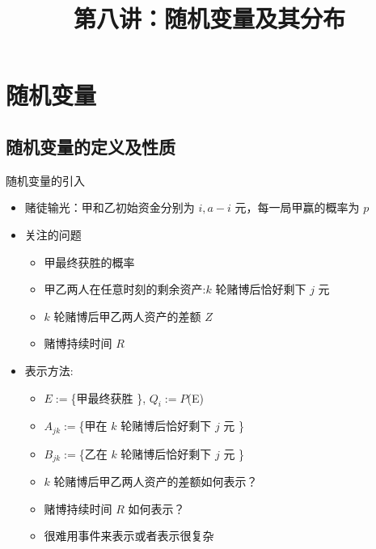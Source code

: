 \title [概率论]{第八讲：随机变量及其分布}
\date{}



{ 
	\begin{frame}
		\titlepage
	\end{frame}
}

\addtocounter{framenumber}{-3}  %
\section{随机变量}

\subsection{随机变量的定义及性质}


\begin{frame}{随机变量的引入}
	\begin{itemize}[<+-|alert@+>]
		\item 赌徒输光：甲和乙初始资金分别为 $i, a-i$ 元，每一局甲赢的概率为 $p$%
		\item 关注的问题
		      \begin{itemize}[<+-|alert@+>]
			      \item 甲最终获胜的概率
			      \item 甲乙两人在任意时刻的剩余资产:$k$ 轮赌博后恰好剩下 $j$ 元
			      \item $k$ 轮赌博后甲乙两人资产的差额 $Z$
			      \item 赌博持续时间 $R$
		      \end{itemize}
		\item 表示方法:
		      \begin{itemize}[<+-|alert@+>]
			      \item $E:=$\{甲最终获胜 \}, $Q_i:=P$(E)
			      \item $A_{jk}:=$\{甲在 $k$ 轮赌博后恰好剩下 $j$ 元 \}
			      \item $B_{jk}:=$\{乙在 $k$ 轮赌博后恰好剩下 $j$ 元 \}
			      \item $k$ 轮赌博后甲乙两人资产的差额如何表示？
			      \item 赌博持续时间 $R$ 如何表示？
			      \item 很难用事件来表示或者表示很复杂
		      \end{itemize}

	\end{itemize}

\end{frame}

